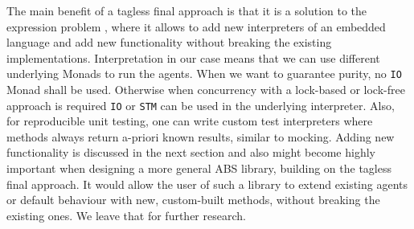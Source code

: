 The main benefit of a tagless final approach is that it is a solution to the expression problem \cite{kiselyov_typed_2012}, where it allows to add new interpreters of an embedded language and add new functionality without breaking the existing implementations. Interpretation in our case means that we can use different underlying Monads to run the agents. When we want to guarantee purity, no \texttt{IO} Monad shall be used. Otherwise when concurrency with a lock-based or lock-free approach is required \texttt{IO} or \texttt{STM} can be used in the underlying interpreter. Also, for reproducible unit testing, one can write custom test interpreters where methods always return a-priori known results, similar to mocking. Adding new functionality is discussed in the next section and also might become highly important when designing a more general ABS library, building on the tagless final approach. It would allow the user of such a library to extend existing agents or default behaviour with new, custom-built methods, without breaking the existing ones. We leave that for further research.
